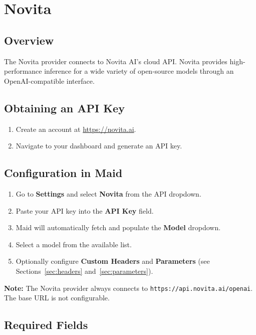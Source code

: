\documentclass[12pt,a4paper]{article}
\begin{document}
\section{Novita}

\subsection{Overview}

The Novita provider connects to Novita AI's cloud API. Novita provides high-performance inference for a wide variety of open-source models through an OpenAI-compatible interface.

\subsection{Obtaining an API Key}

\begin{enumerate}
    \item Create an account at \url{https://novita.ai}.
    \item Navigate to your dashboard and generate an API key.
\end{enumerate}

\subsection{Configuration in Maid}

\begin{enumerate}
    \item Go to \textbf{Settings} and select \textbf{Novita} from the API dropdown.
    \item Paste your API key into the \textbf{API Key} field.
    \item Maid will automatically fetch and populate the \textbf{Model} dropdown.
    \item Select a model from the available list.
    \item Optionally configure \textbf{Custom Headers} and \textbf{Parameters} (see Sections~\ref{sec:headers} and~\ref{sec:parameters}).
\end{enumerate}

\textbf{Note:} The Novita provider always connects to \texttt{https://api.novita.ai/openai}. The base URL is not configurable.

\subsection{Required Fields}
\end{document}
